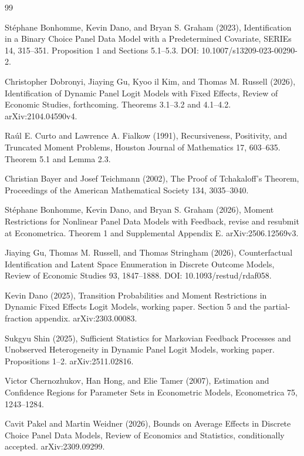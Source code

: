 \documentclass{article}
\begin{document}
\begin{thebibliography}{99}

   Stéphane Bonhomme, Kevin Dano, and Bryan S. Graham (2023), Identification in a Binary Choice Panel Data Model with a Predetermined Covariate, SERIEs 14, 315--351. Proposition 1 and Sections 5.1--5.3. DOI: 10.1007/s13209-023-00290-2.

   Christopher Dobronyi, Jiaying Gu, Kyoo il Kim, and Thomas M. Russell (2026), Identification of Dynamic Panel Logit Models with Fixed Effects, Review of Economic Studies, forthcoming. Theorems 3.1--3.2 and 4.1--4.2. arXiv:2104.04590v4.

   Raúl E. Curto and Lawrence A. Fialkow (1991), Recursiveness, Positivity, and Truncated Moment Problems, Houston Journal of Mathematics 17, 603--635. Theorem 5.1 and Lemma 2.3.

   Christian Bayer and Josef Teichmann (2002), The Proof of Tchakaloff's Theorem, Proceedings of the American Mathematical Society 134, 3035--3040.

   Stéphane Bonhomme, Kevin Dano, and Bryan S. Graham (2026), Moment Restrictions for Nonlinear Panel Data Models with Feedback, revise and resubmit at Econometrica. Theorem 1 and Supplemental Appendix E. arXiv:2506.12569v3.

   Jiaying Gu, Thomas M. Russell, and Thomas Stringham (2026), Counterfactual Identification and Latent Space Enumeration in Discrete Outcome Models, Review of Economic Studies 93, 1847--1888. DOI: 10.1093/restud/rdaf058.

   Kevin Dano (2025), Transition Probabilities and Moment Restrictions in Dynamic Fixed Effects Logit Models, working paper. Section 5 and the partial-fraction appendix. arXiv:2303.00083.

   Sukgyu Shin (2025), Sufficient Statistics for Markovian Feedback Processes and Unobserved Heterogeneity in Dynamic Panel Logit Models, working paper. Propositions 1--2. arXiv:2511.02816.

   Victor Chernozhukov, Han Hong, and Elie Tamer (2007), Estimation and Confidence Regions for Parameter Sets in Econometric Models, Econometrica 75, 1243--1284.

   Cavit Pakel and Martin Weidner (2026), Bounds on Average Effects in Discrete Choice Panel Data Models, Review of Economics and Statistics, conditionally accepted. arXiv:2309.09299.


\end{thebibliography}
\end{document}
